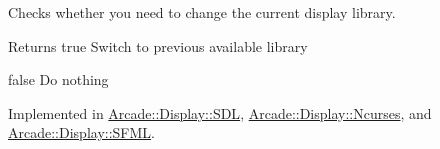 Checks whether you need to change the current display library. 

\begin{DoxyReturn}{Returns}
true Switch to previous available library 

false Do nothing 
\end{DoxyReturn}


Implemented in \mbox{\hyperlink{classArcade_1_1Display_1_1SDL_a27364feeadd0eb907f91e9e4c2ec1ef2}{Arcade\+::\+Display\+::\+S\+DL}}, \mbox{\hyperlink{classArcade_1_1Display_1_1Ncurses_ab92672cecd6fad3116de09fa3f315331}{Arcade\+::\+Display\+::\+Ncurses}}, and \mbox{\hyperlink{classArcade_1_1Display_1_1SFML_ae77df516bddc7ed5a4c0acdcf2443225}{Arcade\+::\+Display\+::\+S\+F\+ML}}.

